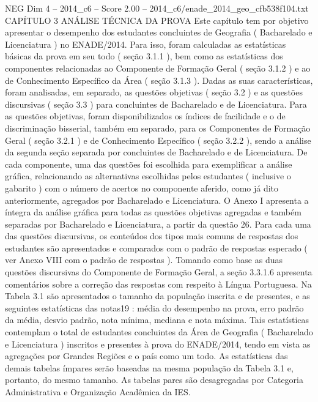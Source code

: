 \begin{textsample}{NEG Dim 4 – 2014\_c6 – Score 2.00 – 2014\_c6/enade\_2014\_geo\_cfb538f104.txt}  \label{ex:f4_neg_286}
CAPÍTULO 3 ANÁLISE TÉCNICA DA PROVA Este capítulo tem por objetivo apresentar o desempenho dos estudantes concluintes de Geografia ( Bacharelado e Licenciatura ) no ENADE/2014.
Para isso, foram calculadas as estatísticas básicas da prova em seu todo ( seção 3.1.1 ), bem como as estatísticas dos componentes relacionadas ao Componente de Formação Geral ( seção 3.1.2 ) e ao de Conhecimento Específico da Área ( seção 3.1.3 ).
Dadas as suas características, foram analisadas, em separado, as questões objetivas ( seção 3.2 ) e as questões discursivas ( seção 3.3 ) para concluintes de Bacharelado e de Licenciatura.
Para as questões objetivas, foram disponibilizados os índices de facilidade e o de discriminação bisserial, também em separado, para os Componentes de Formação Geral ( seção 3.2.1 ) e de Conhecimento Específico ( seção 3.2.2 ), sendo a análise da segunda seção separada por concluintes de Bacharelado e de Licenciatura.
De cada componente, uma das questões foi escolhida para exemplificar a análise gráfica, relacionando as alternativas escolhidas pelos estudantes ( inclusive o gabarito ) com o número de acertos no componente aferido, como já dito anteriormente, agregados por Bacharelado e Licenciatura.
O Anexo I apresenta a íntegra da análise gráfica para todas as questões objetivas agregadas e também separadas por Bacharelado e Licenciatura, a partir da questão 26.
Para cada uma das questões discursivas, os conteúdos dos tipos mais comuns de respostas dos estudantes são apresentados e comparados com o padrão de respostas esperado ( ver Anexo VIII com o padrão de respostas ).
Tomando como base as duas questões discursivas do Componente de Formação Geral, a seção 3.3.1.6 apresenta comentários sobre a correção das respostas com respeito à Língua Portuguesa.
Na Tabela 3.1 são apresentados o tamanho da população inscrita e de presentes, e as seguintes estatísticas das notas19 : média do desempenho na prova, erro padrão da média, desvio padrão, nota mínima, mediana e nota máxima.
Tais estatísticas contemplam o total de estudantes concluintes da Área de Geografia ( Bacharelado e Licenciatura ) inscritos e presentes à prova do ENADE/2014, tendo em vista as agregações por Grandes Regiões e o país como um todo.
As estatísticas das demais tabelas ímpares serão baseadas na mesma população da Tabela 3.1 e, portanto, do mesmo tamanho.
As tabelas pares são desagregadas por Categoria Administrativa e Organização Acadêmica da IES.

\end{textsample}

